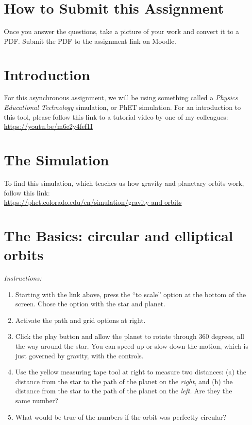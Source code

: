 \documentclass[10pt]{article}
\begin{document}
\maketitle

\section{How to Submit this Assignment}

Once you answer the questions, take a picture of your work and convert it to a PDF.  Submit the PDF to the assignment link on Moodle.

\section{Introduction}

For this asynchronous assignment, we will be using something called a \textit{Physics Educational Technology} simulation, or PhET simulation.  For an introduction to this tool, please follow this link to a tutorial video by one of my colleagues: \\

\url{https://youtu.be/m6e2y4fef1I}

\section{The Simulation}

To find this simulation, which teaches us how gravity and planetary orbits work, follow this link: \\

\url{https://phet.colorado.edu/en/simulation/gravity-and-orbits}

\section{The Basics: circular and elliptical orbits}

\textit{Instructions:}
\begin{enumerate}
\item Starting with the link above, press the ``to scale'' option at the bottom of the screen.  Chose the option with the star and planet.
\item Activate the path and grid options at right.
\item Click the play button and allow the planet to rotate through 360 degrees, all the way around the star.  You can speed up or slow down the motion, which is just governed by gravity, with the controls.
\item Use the yellow measuring tape tool at right to measure two distances: (a) the distance from the star to the path of the planet on the \textit{right}, and (b) the distance from the star to the path of the planet on the \textit{left.}  Are they the same number?
\item What would be true of the numbers if the orbit was perfectly circular? 
\end{enumerate}
\vspace{1cm}
\end{document}

